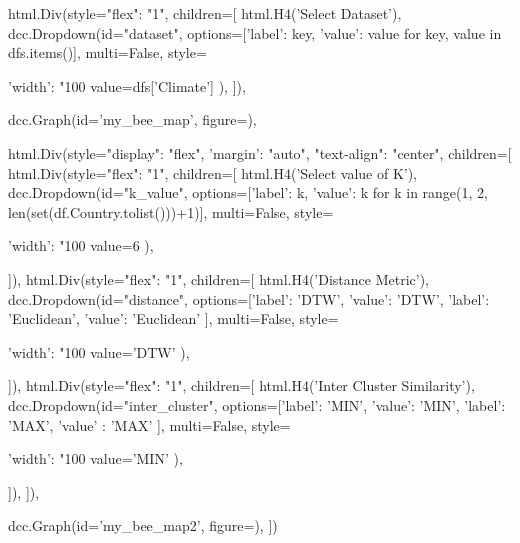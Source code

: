     html.Div(style={"flex": "1"}, children=[
                html.H4('Select Dataset'),
                dcc.Dropdown(id="dataset",
                             options=[{'label': key, 'value': value} for key, value in dfs.items()],
                             multi=False,
                             style={'width': "100%
                             value=dfs['Climate']
                             ),
            ]),

    dcc.Graph(id='my_bee_map', figure={}),

    html.Div(style={"display": "flex", 'margin': "auto", "text-align": "center"}, children=[
        html.Div(style={"flex": "1"}, children=[
            html.H4('Select value of K'),
            dcc.Dropdown(id="k_value",
                                 options=[{'label': k, 'value': k} for k in range(1, 2, len(set(df.Country.tolist()))+1)],
                                 multi=False,
                                 style={'width': "100%
                                 value=6
                             ),

        ]),
        html.Div(style={"flex": "1"}, children=[
                    html.H4('Distance Metric'),
                    dcc.Dropdown(id="distance",
                                         options=[{'label': 'DTW', 'value': 'DTW'}, {'label': 'Euclidean', 'value': 'Euclidean'} ],
                                         multi=False,
                                         style={'width': "100%
                                         value='DTW'
                                     ),

                ]),
        html.Div(style={"flex": "1"}, children=[
                    html.H4('Inter Cluster Similarity'),
                    dcc.Dropdown(id="inter_cluster",
                                         options=[{'label': 'MIN', 'value': 'MIN'},
                                                  {'label': 'MAX', 'value' : 'MAX'}
                                                  ],
                                         multi=False,
                                         style={'width': "100%
                                         value='MIN'
                                     ),

                ]),
    ]),

    dcc.Graph(id='my_bee_map2', figure={}),
])


}}}}
